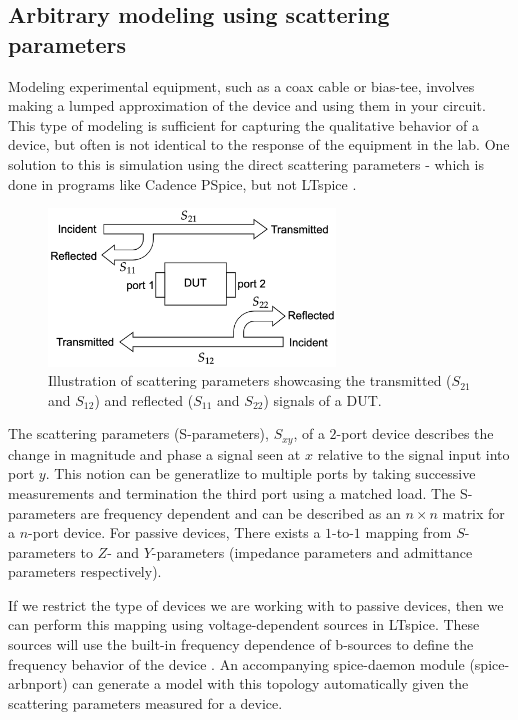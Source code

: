 \documentclass[]{article}
\newcommand{\todo}[2][]{}
\newcommand{\cf}[1]{\textsf{#1}}
\begin{document}
\subsection{Arbitrary modeling using scattering parameters}

Modeling experimental equipment, such as a coax cable or bias-tee, involves making a 
lumped approximation of the device and using them in your circuit. 
This type of modeling is sufficient for capturing the qualitative behavior of a device,
but often is not identical to the response of the equipment in the lab.
One solution to this is simulation using the direct scattering parameters - which is
done in programs like Cadence PSpice, but not LTspice \todo[]{cite pspice}.

\todo[]{another advantage is you can measure s param of entire setup. sim actions will
always match setup :)}

\begin{figure}[h]
    \centering
    \includegraphics[width=3in]{figs/sxy_diagram.png}
    \caption{Illustration of scattering parameters showcasing the transmitted ($S_{21}$ and $S_{12}$) and reflected ($S_{11}$ and $S_{22}$) signals of a DUT.}
    \label{fig:sxy}
\end{figure}

The scattering parameters (S-parameters), $S_{xy}$, of a $2$-port device describes the
change in magnitude and phase a signal seen at $x$ relative to the signal 
input into port $y$. This notion can be generatlize to multiple ports
by taking successive measurements and termination the third port using a
matched load. The S-parameters are frequency dependent and can be described
as an $n\times n$ matrix for a $n$-port device. For passive devices, There exists a 
$1$-to-$1$ mapping from $S$-parameters to $Z$- and $Y$-parameters (impedance 
parameters and admittance parameters respectively).

If we restrict the type of devices we are working with to passive devices,
then we can perform this mapping using voltage-dependent sources in 
LTspice. These sources will use the built-in frequency dependence of b-sources to
define the frequency behavior of the device \cite{microsim}. An accompanying spice-daemon
module (\cf{spice-arbnport}) can generate a model with this topology
automatically given the scattering parameters measured for a device.
\end{document}
